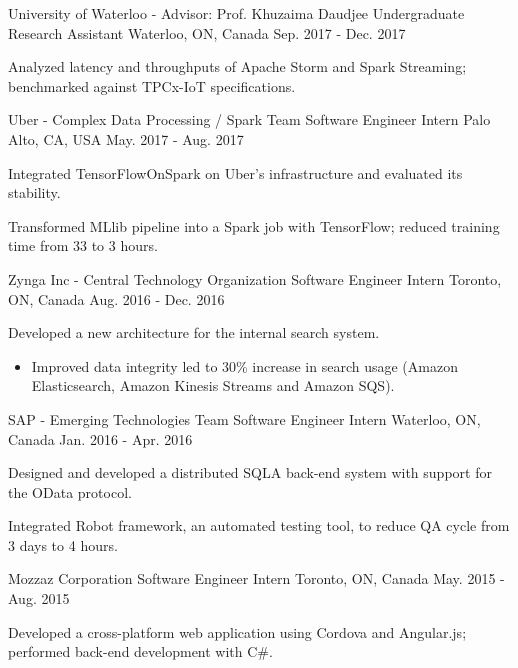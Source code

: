 \begin{cventries}
{}
\cventry
{University of Waterloo - Advisor: Prof. Khuzaima Daudjee} %
{Undergraduate Research Assistant} %
{Waterloo, ON, Canada} %
{Sep. 2017 - Dec. 2017} %
{ %
\begin{cvitems}
\item {Analyzed latency and throughputs of Apache Storm and Spark Streaming; benchmarked against TPCx-IoT specifications.}
\end{cvitems}
}
\cventry
{Uber - Complex Data Processing / Spark Team} %
{Software Engineer Intern} %
{Palo Alto, CA, USA} %
{May. 2017 - Aug. 2017} %
{ %
\begin{cvitems}
\item {Integrated TensorFlowOnSpark on Uber's infrastructure and evaluated its stability.}
\item {Transformed MLlib pipeline into a Spark job with TensorFlow; reduced training time from 33 to 3 hours.}
\end{cvitems}
}
\cventry
{Zynga Inc - Central Technology Organization} %
{Software Engineer Intern} %
{Toronto, ON, Canada} %
{Aug. 2016 - Dec. 2016} %
{ %
\begin{cvitems}
\item {Developed a new architecture for the internal search system.}
\begin{itemize}[label=$\cdot$,leftmargin=0.7em]
\item {Improved data integrity led to 30\% increase in search usage (Amazon Elasticsearch, Amazon Kinesis Streams and Amazon SQS).}
\end{itemize}
\end{cvitems}
}
\cventry
{SAP - Emerging Technologies Team} %
{Software Engineer Intern} %
{Waterloo, ON, Canada} %
{Jan. 2016 - Apr. 2016} %
{ %
\begin{cvitems}
\item {Designed and developed a distributed SQLA back-end system with support for the OData protocol.}
\item {Integrated Robot framework, an automated testing tool, to reduce QA cycle from 3 days to 4 hours.}
\end{cvitems}
}
\cventry
{Mozzaz Corporation} %
{Software Engineer Intern} %
{Toronto, ON, Canada} %
{May. 2015 - Aug. 2015} %
{ %
\begin{cvitems}
\item {Developed a cross-platform web application using Cordova and Angular.js; performed back-end development with C\#.}
\end{cvitems}
}

\end{cventries}
